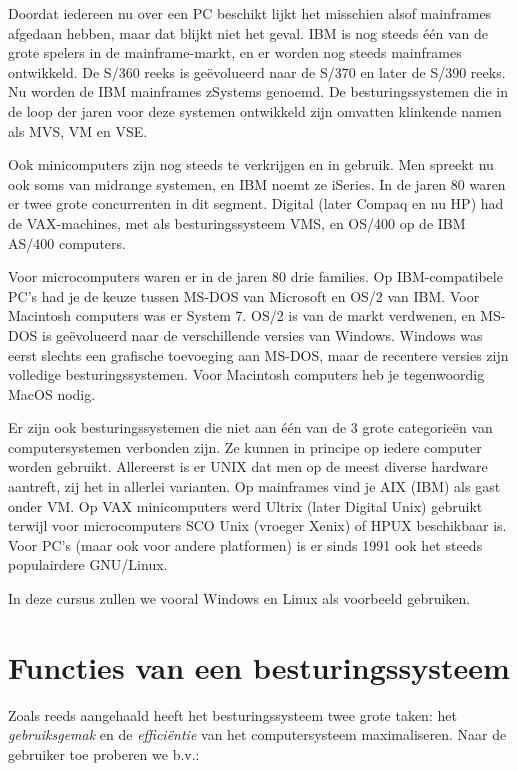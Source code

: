 Doordat iedereen nu over een PC beschikt lijkt het misschien alsof
mainframes afgedaan hebben, maar dat blijkt niet het geval. IBM is nog
steeds \'e\'en van de grote spelers in de mainframe-markt, en er worden nog
steeds mainframes ontwikkeld. De S/360 reeks is ge\"evolueerd naar de
S/370 en later de S/390 reeks. Nu worden de IBM mainframes zSystems
genoemd. De besturingssystemen die in de loop der jaren voor deze
systemen ontwikkeld zijn omvatten klinkende namen als MVS, VM en
VSE.

Ook minicomputers zijn nog steeds te verkrijgen en in gebruik. Men
spreekt nu ook soms van midrange systemen, en IBM noemt ze iSeries. In
de jaren 80 waren er twee grote concurrenten in dit segment. Digital
(later Compaq en nu HP) had de VAX-machines, met als besturingssysteem
VMS, en OS/400 op de IBM AS/400 computers.

Voor microcomputers waren er in de jaren 80 drie families. Op
IBM-compatibele PC's had je de keuze tussen MS-DOS van Microsoft en OS/2
van IBM. Voor Macintosh computers was er System 7. OS/2 is van de markt
verdwenen, en MS-DOS is ge\"evolueerd naar de verschillende versies van
Windows. Windows was eerst slechts een grafische toevoeging aan MS-DOS,
maar de recentere versies zijn volledige besturingssystemen. Voor
Macintosh computers heb je tegenwoordig MacOS nodig.

Er zijn ook besturingssystemen die niet aan \'e\'en van de 3 grote
categorie\"en van computersystemen verbonden zijn. Ze kunnen in principe
op iedere computer worden gebruikt. Allereerst is er UNIX dat men op de
meest diverse hardware aantreft, zij het in allerlei varianten. Op
mainframes vind je AIX (IBM) als gast onder VM. Op VAX minicomputers
werd Ultrix (later Digital Unix) gebruikt terwijl voor microcomputers
SCO Unix (vroeger Xenix) of HPUX beschikbaar is. Voor PC's (maar ook
voor andere platformen) is er sinds 1991 ook het steeds populairdere
GNU/Linux.

In deze cursus zullen we vooral Windows en Linux als voorbeeld
gebruiken.

\section{Functies van een besturingssysteem}

Zoals reeds aangehaald heeft het besturingssysteem twee grote
taken: het \emph{gebruiksgemak} en de
\emph{effici\"entie} van het computersysteem maximaliseren.
Naar de gebruiker toe proberen we b.v.:

